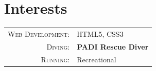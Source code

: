 %
%
%

\section{\texorpdfstring{\color{Blue}Interests}{Interests}}
\begin{tabular}{rl}
    \textsc{Web Development:} & HTML5, CSS3 \\ 
    \textsc{Diving:} & \textbf{PADI Rescue Diver} \\ 
    \textsc{Running:} & Recreational \\ 
\end{tabular}
